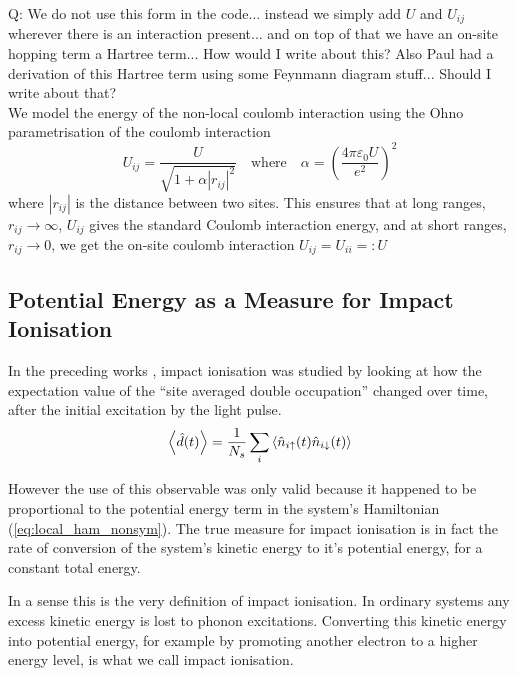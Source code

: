 {\color{red} Q: We do not use this form in the code... instead we simply add $U$ and $U_{ij}$ wherever there is an interaction present... and on top of that we have an on-site hopping term a Hartree term... How would I write about this? Also Paul had a derivation of this Hartree term using some Feynmann diagram stuff... Should I write about that?}
\\

We model the energy of the non-local coulomb interaction using the Ohno parametrisation of the coulomb interaction  \cite{ppp_ohno, hoerbinger}
\begin{equation}
    U_{ij} = \frac{U}{\sqrt{1 + \alpha |r_{ij}|^2}} \quad \text{where} \quad \alpha = \left(\frac{4\pi\varepsilon_0 U}{e^2} \right)^2 \label{eq:ohno_interpolation}
\end{equation}
where $|r_{ij}|$ is the distance between two sites. This ensures that at long ranges, $r_{ij}\to\infty$, $U_{ij}$ gives the standard Coulomb interaction energy, and at short ranges, $r_{ij}\to 0$, we get the on-site coulomb interaction $U_{ij} = U_{ii} =: U$ 

\subsection{Potential Energy as a Measure for Impact Ionisation}
In the preceding works \cite{innerberger,worm_bachelor,worm_project,prauhart}, impact ionisation was studied by looking at how the expectation value of the ``site averaged double occupation'' changed over time, after the initial excitation by the light pulse.
\begin{equation}
    \left\langle{\hat{d}(t)}\right\rangle = \frac{1}{N_s}\sum_i \braket{\hat{n}_{i\uparrow}(t)\hat{n}_{i\downarrow}(t)}
\end{equation}

However the use of this observable was only valid because it happened to be proportional to the potential energy term in the system's Hamiltonian (\ref{eq:local_ham_nonsym}). The true measure for impact ionisation is in fact the rate of conversion of the system's kinetic energy to it's potential energy, for a constant total energy.

\medskip
In a sense this is the very definition of impact ionisation. In ordinary systems any excess kinetic energy is lost to phonon excitations. Converting this kinetic energy into potential energy, for example by promoting another electron to a higher energy level, is what we call impact ionisation.
\medskip

